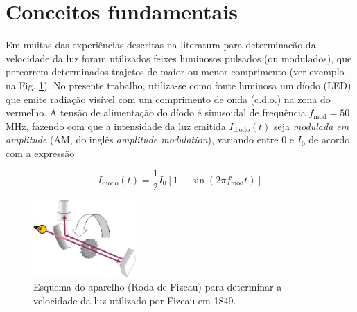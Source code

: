 \documentclass[12pt,a4paper,oneside]{paper}
\begin{document}
\pagestyle{fancy}
\fancyhf{} %

%
% 



\def\title {}


%
% 

 
\normalsize
\cleardoublepage
\setcounter{page}{1}
\selectfont
%
%

\printindex

\section{\sf Conceitos fundamentais}
Em muitas das experiências descritas na literatura para determinacão da velocidade da luz foram utilizados feixes luminosos
pulsados (ou modulados), que percorrem determinados trajetos de maior ou menor comprimento (ver exemplo na Fig. \ref{fig:Fizeau}). 
No presente trabalho, utiliza-se como fonte luminosa um díodo (LED) que emite radiação  visível com um comprimento de onda (c.d.o.)
na zona do vermelho. A tensão de alimentação do díodo é sinusoidal de frequência $f_{\textrm{mod}}=50$ MHz, fazendo com que a
intensidade da luz emitida $I_{\textrm{diodo}}(t)$ seja \emph{modulada em amplitude} (AM, do inglês \emph{amplitude modulation}),
variando entre 0 e $I_0$ de acordo com a expressão

\begin{equation*}
	\label{eq:f_am}
		I_{\textrm{diodo}}(t) = \frac{1}{2}I_0 [1+ \sin ( 2\pi f_{\textrm{mod}} t)]
\end{equation*}

\begin{figure}[H] 
    \centering 
	\includegraphics[width=0.35\textwidth]{./luz_images/Fizeau.JPG}
	\caption{Esquema do aparelho (Roda de Fizeau) para determinar a velocidade da luz utilizado por Fizeau em 1849.
    \label{fig:Fizeau}} 
\end{figure}
\end{document}
